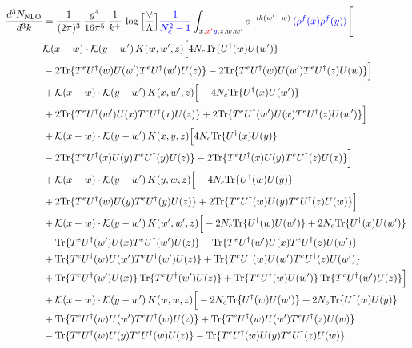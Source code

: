 \documentclass[9pt]{article}
\numberwithin{equation}{section}
\newcommand{\new}[1]{{\color{blue}#1}}
\newcommand{\old}[1]{{\color{red}#1}}
\begin{document}
\begin{align}
    \frac{d^{3}N_{\mathrm{NLO}}}{d^{3}k} & = \frac{1}{(2\pi)^{3}}\,\frac{g^{4}}{16\pi^{5}}\,\frac{1}{k^{+}}\,\log\Big[\frac{\vee}{\Lambda}\Big]\new{\frac{1}{N_c^2-1}}\int_{x,\old{x'}\new{y},z,w,w'}e^{-ik(w'-w)}\,\new{\langle\rho^f(x)\rho^f(y)\rangle}\Bigg[\notag \\ & \mathcal K(x-w)\cdot\mathcal K(y-w')\,K(w,w',z)\Big[4 N_c{\rm Tr}\{U^\dagger(w)U(w')\}\notag\\
&-2{\rm Tr}\{T^eU^\dagger(w)U(w')T^eU^\dagger(w')U(z)\}-2{\rm Tr}\{T^eU^\dagger(w)U(w')T^eU^\dagger(z)U(w)\}\Big]\notag\\
&+\mathcal K(x-w)\cdot\mathcal K(y-w')\,K(x,w',z)\Big[-4 N_c{\rm Tr}\{U^\dagger(x)U(w')\}\notag\\
&+2{\rm Tr}\{T^eU^\dagger(w')U(x)T^eU^\dagger(x)U(z)\}+2{\rm Tr}\{T^eU^\dagger(w')U(x)T^eU^\dagger(z)U(w')\}\Big]\notag\\
&+\mathcal K(x-w)\cdot\mathcal K(y-w')\,K(x,y,z)\Big[4 N_c{\rm Tr}\{U^\dagger(x)U(y)\}\notag\\
&-2{\rm Tr}\{T^eU^\dagger(x)U(y)T^eU^\dagger(y)U(z)\}-2{\rm Tr}\{T^eU^\dagger(x)U(y)T^eU^\dagger(z)U(x)\}\Big]\notag\\
&+\mathcal K(x-w)\cdot\mathcal K(y-w')\,K(y,w,z)\Big[-4 N_c{\rm Tr}\{U^\dagger(w)U(y)\}\notag\\
&+2{\rm Tr}\{T^eU^\dagger(w)U(y)T^eU^\dagger(y)U(z)\}+2{\rm Tr}\{T^eU^\dagger(w)U(y)T^eU^\dagger(z)U(w)\}\Big]\notag\\
&+\mathcal K(x-w)\cdot\mathcal K(y-w')\,K(w',w',z)\Big[-2 N_c{\rm Tr}\{U^\dagger(w)U(w')\}+2 N_c{\rm Tr}\{U^\dagger(x)U(w')\}\notag\\
&-{\rm Tr}\{T^eU^\dagger(w')U(x)T^eU^\dagger(w')U(z)\}-{\rm Tr}\{T^eU^\dagger(w')U(x)T^eU^\dagger(z)U(w')\}\notag\\
&+{\rm Tr}\{T^eU^\dagger(w)U(w')T^eU^\dagger(w')U(z)\}+{\rm Tr}\{T^eU^\dagger(w)U(w')T^eU^\dagger(z)U(w')\}\notag\\
&+{\rm Tr}\{T^eU^\dagger(w')U(x)\}\,{\rm Tr}\{T^eU^\dagger(w')U(z)\}+{\rm Tr}\{T^eU^\dagger(w)U(w')\}\,{\rm Tr}\{T^eU^\dagger(w')U(z)\}\Big]\notag\\
&+\mathcal K(x-w)\cdot\mathcal K(y-w')\,K(w,w,z)\Big[-2 N_c{\rm Tr}\{U^\dagger(w)U(w')\}+2 N_c{\rm Tr}\{U^\dagger(w)U(y)\}\notag\\
&+{\rm Tr}\{T^eU^\dagger(w)U(w')T^eU^\dagger(w)U(z)\}+{\rm Tr}\{T^eU^\dagger(w)U(w')T^eU^\dagger(z)U(w)\}\notag\\
&-{\rm Tr}\{T^eU^\dagger(w)U(y)T^eU^\dagger(w)U(z)\}-{\rm Tr}\{T^eU^\dagger(w)U(y)T^eU^\dagger(z)U(w)\}\notag\\

\end{align}
\end{document}
